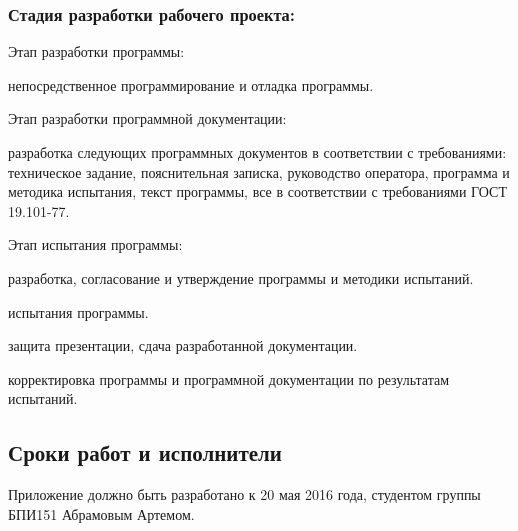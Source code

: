 \subsubsection{Стадия разработки рабочего проекта:}
\begin{my_enumerate}
\item Этап разработки программы:
    \begin{my_enumerate}
    \item непосредственное программирование и отладка программы.
    \end{my_enumerate}
\item Этап разработки программной документации:
    \begin{my_enumerate}
    \item разработка следующих программных документов в соответствии с требованиями: техническое задание, пояснительная записка, руководство оператора, программа и методика испытания, текст программы, все в соответствии с требованиями ГОСТ 19.101-77.
    \end{my_enumerate}
\item Этап испытания программы:    
    \begin{my_enumerate}
    \item разработка, согласование и утверждение программы и методики испытаний.
    \item испытания программы.
    \item защита презентации, сдача разработанной документации.
    \item корректировка программы и программной документации по результатам испытаний.
    \end{my_enumerate}
\end{my_enumerate}


\subsection{Сроки работ и исполнители}
Приложение должно быть разработано к 20 мая 2016 года, студентом группы БПИ151 Абрамовым Артемом.
